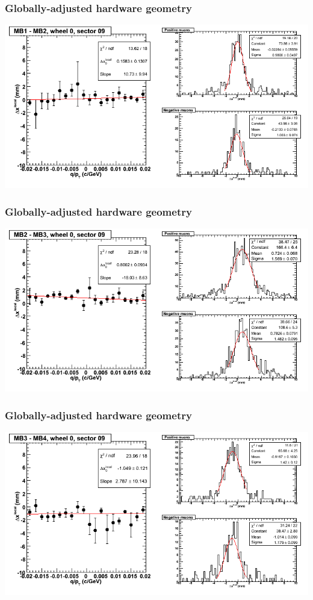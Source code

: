 \documentclass[compress]{beamer}
\begin{document}
\begin{frame}
\frametitle{Globally-adjusted hardware geometry}
\includegraphics[width=\linewidth]{NOV4_segdiffs_HW/dt13_resid_C_09_12.png}
\end{frame}

\begin{frame}
\frametitle{Globally-adjusted hardware geometry}
\includegraphics[width=\linewidth]{NOV4_segdiffs_HW/dt13_resid_C_09_23.png}
\end{frame}

\begin{frame}
\frametitle{Globally-adjusted hardware geometry}
\includegraphics[width=\linewidth]{NOV4_segdiffs_HW/dt13_resid_C_09_34.png}
\end{frame}
\end{document}
